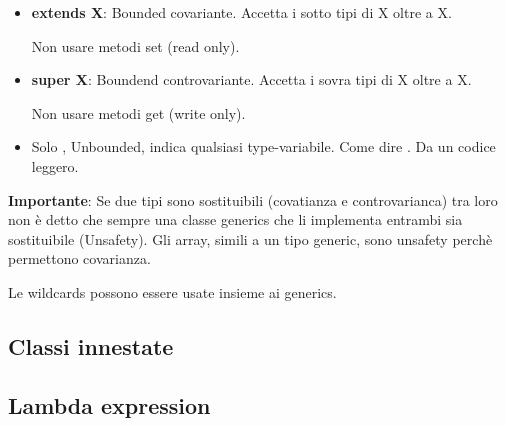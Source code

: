 \begin{itemize}
	\item \textbf{extends X}: Bounded covariante. Accetta i sotto tipi di X oltre a X.

	Non usare metodi set (read only).
	\item \textbf{super X}: Boundend controvariante. Accetta i sovra tipi di X oltre a X.

	Non usare metodi get (write only).
	\item Solo , Unbounded, indica qualsiasi type-variabile. Come dire . Da un codice leggero.
\end{itemize}

\textbf{Importante}: Se due tipi sono sostituibili (covatianza e controvarianca) tra loro non è detto che sempre una classe generics che li implementa entrambi sia sostituibile (Unsafety).
Gli array, simili a un tipo generic, sono unsafety perchè permettono covarianza.

Le wildcards possono essere usate insieme ai generics.

\subsection{Classi innestate}

\subsection{Lambda expression}